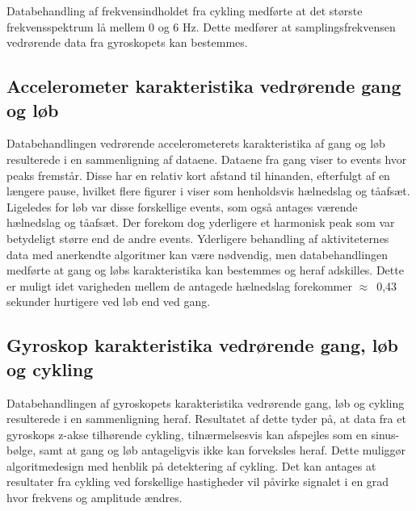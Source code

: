 Databehandling af frekvensindholdet fra cykling medførte at det største frekvensspektrum lå mellem 0 og 6 Hz. Dette medfører at samplingsfrekvensen vedrørende data fra gyroskopets kan bestemmes. 

\subsection{Accelerometer karakteristika vedrørende gang og løb}
Databehandlingen vedrørende accelerometerets karakteristika af gang og løb resulterede i en sammenligning af dataene. Dataene fra gang viser to events hvor peaks fremstår. Disse har en relativ kort afstand til hinanden, efterfulgt af en længere pause, hvilket flere figurer i  viser som henholdsvis hælnedslag og tåafsæt. Ligeledes for løb var disse forskellige events, som også antages værende hælnedslag og tåafsæt. Der forekom dog yderligere et harmonisk peak som var betydeligt større end de andre events. Yderligere behandling af aktiviteternes data med anerkendte algoritmer kan være nødvendig, men databehandlingen medførte at gang og løbs karakteristika kan bestemmes og heraf adskilles. Dette er muligt idet varigheden mellem de antagede hælnedslag forekommer $\approx$~0,43 sekunder hurtigere ved løb end ved gang.

\subsection{Gyroskop karakteristika vedrørende gang, løb og cykling}
Databehandlingen af gyroskopets karakteristika vedrørende gang, løb og cykling resulterede i en sammenligning heraf. Resultatet af dette tyder på, at data fra et gyroskops z-akse tilhørende cykling, tilnærmelsesvis kan afspejles som en sinus-bølge, samt at gang og løb antageligvis ikke kan forveksles heraf. Dette muliggør algoritmedesign med henblik på detektering af cykling. Det kan antages at resultater fra cykling ved forskellige hastigheder vil påvirke signalet i en grad hvor frekvens og amplitude ændres.

